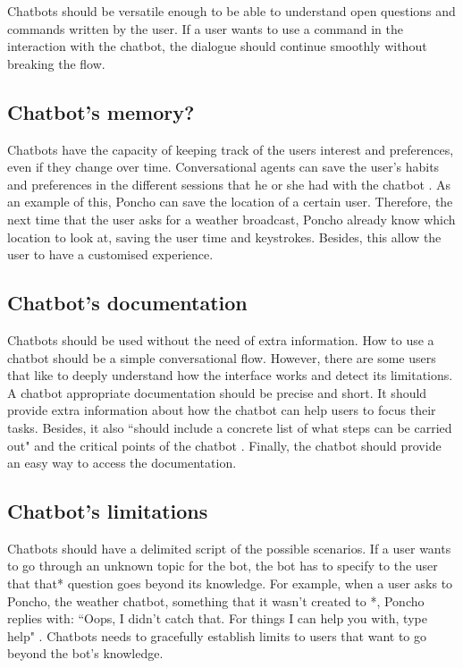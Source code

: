 \documentclass[a4paper,10pt]{article}
\begin{document}
Chatbots should be versatile enough to be able to understand open questions and commands written by the user. If a user wants to use a command in the interaction with the chatbot, the dialogue should continue smoothly without breaking the flow.

\subsection*{Chatbot's memory?}

Chatbots have the capacity of keeping track of the users interest and preferences, even if they change over time. Conversational agents can save the user's habits and preferences in the different sessions that he or she had with the chatbot \cite{shneiderman1997direct}. As an example of this, Poncho can save the location of a certain user. Therefore, the next time that the user asks for a weather broadcast, Poncho already know which location to look at, \cite{poncho2017} saving the user time and keystrokes. Besides, this allow the user to have a customised experience. 


\subsection*{Chatbot's documentation}

Chatbots should be used without the need of extra information. How to use a chatbot should be a simple conversational flow. However, there are some users that like to deeply understand how the interface works and detect its limitations. A chatbot appropriate documentation should be precise and short. It should provide extra information about how the chatbot can help users to focus their tasks. Besides, it also ``should include a concrete list of what steps can be carried out" and the critical points of the chatbot \cite{HeuristicsWebPage}. Finally, the chatbot should provide an easy way to access the documentation.   

\subsection*{Chatbot's limitations}

Chatbots should have a delimited script of the possible scenarios. If a user wants to go through an unknown topic for the bot, the bot has to specify to the user that that* question goes beyond its knowledge. For example, when a user asks to Poncho, the weather chatbot, something that it wasn't created to *, Poncho replies with: ``Oops, I didn't catch that. For things I can help you with, type help" \cite{HeuristicsWebPage}. Chatbots needs to gracefully establish limits to users that want to go beyond the bot's knowledge.  

\medskip


\end{document}
